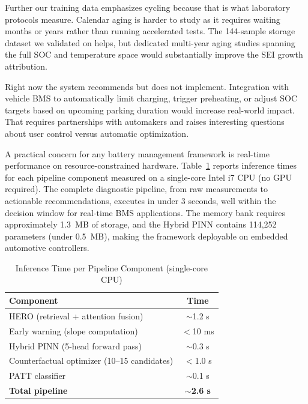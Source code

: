\documentclass[5p,times,authoryear]{elsarticle}
\begin{document}
Further our training data emphasizes cycling because that is what laboratory protocols measure. Calendar aging is harder to study as it requires waiting months or years rather than running accelerated tests. The 144-sample storage dataset we validated on helps, but dedicated multi-year aging studies spanning the full SOC and temperature space would substantially improve the SEI growth attribution.

Right now the system recommends but does not implement. Integration with vehicle BMS to automatically limit charging, trigger preheating, or adjust SOC targets based on upcoming parking duration would increase real-world impact. That requires partnerships with automakers and raises interesting questions about user control versus automatic optimization.

A practical concern for any battery management framework is real-time performance on resource-constrained hardware. Table~\ref{tab:inference_time} reports inference times for each pipeline component measured on a single-core Intel i7 CPU (no GPU required). The complete diagnostic pipeline, from raw measurements to actionable recommendations, executes in under 3 seconds, well within the decision window for real-time BMS applications. The memory bank requires approximately 1.3~MB of storage, and the Hybrid PINN contains 114,252 parameters (under 0.5~MB), making the framework deployable on embedded automotive controllers.

\begin{table}[!htb]
\caption{Inference Time per Pipeline Component (single-core CPU)}
\begin{center}
\begin{tabular}{lc}
\toprule
\textbf{Component} & \textbf{Time} \\
\midrule
HERO (retrieval + attention fusion) & $\sim$1.2 s \\
Early warning (slope computation) & $<$10 ms \\
Hybrid PINN (5-head forward pass) & $\sim$0.3 s \\
Counterfactual optimizer (10--15 candidates) & $<$1.0 s \\
PATT classifier & $\sim$0.1 s \\
\midrule
\textbf{Total pipeline} & \textbf{$\sim$2.6 s} \\
\bottomrule
\end{tabular}
\end{center}
\label{tab:inference_time}
\end{table}
\end{document}
